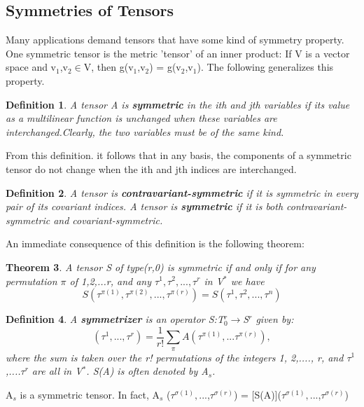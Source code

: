 \documentclass[12pt,a4paper]{article}
\newtheorem{thm}{Theorem}
\newtheorem{defn}[thm]{Definition}
\begin{document}
\subsection{Symmetries of Tensors}
Many applications demand tensors that have some kind of symmetry property. One symmetric tensor is the metric 'tensor' of an inner product: If V is a vector space  and v$_1$,v$_2$$\in$V, then g(v$_1$,v$_2$) = g(v$_2$,v$_1$). The following generalizes this property.
\begin{defn}
A tensor A is \textbf{symmetric} in the ith and jth variables if its value as a multilinear function is unchanged when these variables are interchanged.Clearly, the two variables must be of the same kind.
\end{defn}
\hspace{1cm} From this definition. it follows that in any basis, the components of a symmetric tensor do not change when the ith and jth indices are interchanged.
\begin{defn}
A tensor is \textbf{contravariant-symmetric} if it is symmetric in every pair of its covariant indices. A tensor is \textbf{symmetric} if it is both contravariant-symmetric and covariant-symmetric.
\end{defn}
\hspace{1cm} An immediate consequence of this definition is the following theorem:
\begin{thm}
A tensor S of type(r,0) is symmetric if and only if for any permutation $\pi$ of 1,2,...r, and any $\tau^1,\tau^2,...,\tau^r$ in V$^*$ we have \begin{equation}
S(\tau^{\pi(1)},\tau^{\pi(2)},...,\tau^{\pi(r)}) = S(\tau^1,\tau^2,...,\tau^n)
\end{equation}
\end{thm}
\begin{defn}
A \textbf{symmetrizer} is an operator S:T$_0^r\to$S$^r$ given by:\begin{equation}
[S(A)](\tau^1,...,\tau^r) = \dfrac{1}{r!}\sum_{\pi}A(\tau^{\pi(1)},...\tau^{\pi(r)}),
\end{equation}
where the sum is taken over the r! permutations of the integers 1, 2,...., r, and $\tau^1$,....$\tau^r$ are all in V$^*$. S(A) is often denoted by A$_s$.
\end{defn}
A$_s$ is a symmetric tensor. In fact,
A$_s$ ($\tau^{\sigma(1)},$...,$\tau^{\sigma(r)}$) =
[S(A)]($\tau^{\sigma(1)},$...,$\tau^{\sigma(r)}$)\\
$$
\end{document}
